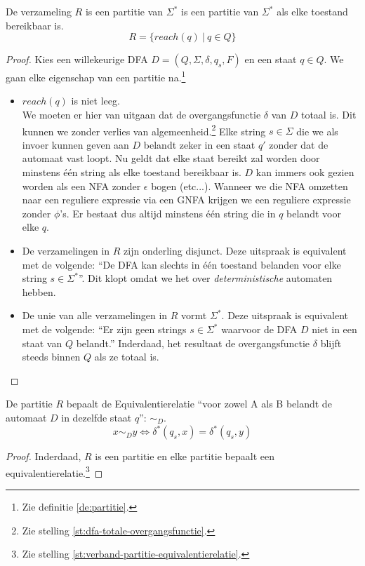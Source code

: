 \documentclass[main.tex]{subfiles}
\begin{document}
\begin{st}
  De verzameling $R$ is een partitie van $\Sigma^{*}$ is een partitie van $\Sigma^{*}$ als elke toestand bereikbaar is.
  \[ R = \{ reach(q)\ |\ q \in Q \} \]

  \begin{proof}
    Kies een willekeurige DFA $D = (Q,\Sigma,\delta,q_{s},F)$ en een staat $q\in Q$.
    We gaan elke eigenschap van een partitie na.\footnote{Zie definitie \ref{de:partitie}.}
    \begin{itemize}
    \item $reach(q)$ is niet leeg.\\
      We moeten er hier van uitgaan dat de overgangsfunctie $\delta$ van $D$ totaal is.
      Dit kunnen we zonder verlies van algemeenheid.\footnote{Zie stelling \ref{st:dfa-totale-overgangsfunctie}.}
      Elke string $s\in \Sigma$ die we als invoer kunnen geven aan $D$ belandt zeker in een staat $q'$ zonder dat de automaat vast loopt.
      Nu geldt dat elke staat bereikt zal worden door minstens \'e\'en string als elke toestand bereikbaar is.
      $D$ kan immers ook gezien worden als een NFA zonder $\epsilon$ bogen (etc...). Wanneer we die NFA omzetten naar een reguliere expressie via een GNFA krijgen we een reguliere expressie zonder $\phi$'s. Er bestaat dus altijd minstens \'e\'en string die in $q$ belandt voor elke $q$.
    \item De verzamelingen in $R$ zijn onderling disjunct.
      Deze uitspraak is equivalent met de volgende: ``De DFA kan slechts in \'e\'en toestand belanden voor elke string $s\in\Sigma^{*}$''. Dit klopt omdat we het over \emph{deterministische} automaten hebben.
    \item De unie van alle verzamelingen in $R$ vormt $\Sigma^{*}$.
      Deze uitspraak is equivalent met de volgende: ``Er zijn geen strings $s\in \Sigma^{*}$ waarvoor de DFA $D$ niet in een staat van $Q$ belandt.''
      Inderdaad, het resultaat de overgangsfunctie $\delta$ blijft steeds binnen $Q$ als ze totaal is.
    \end{itemize}
  \end{proof}
\end{st}

\begin{gev}
  De partitie $R$ bepaalt de Equivalentierelatie ``voor zowel A als B belandt de automaat $D$ in dezelfde staat $q$'': $\sim_{D}$.
  \[ x \sim_{D} y \Leftrightarrow \delta^{*}(q_{s},x) = \delta^{*}(q_{s},y) \]

  \begin{proof}
    Inderdaad, $R$ is een partitie en elke partitie bepaalt een equivalentierelatie.\footnote{Zie stelling \ref{st:verband-partitie-equivalentierelatie}.}
  \end{proof}
\end{gev}
\end{document}
